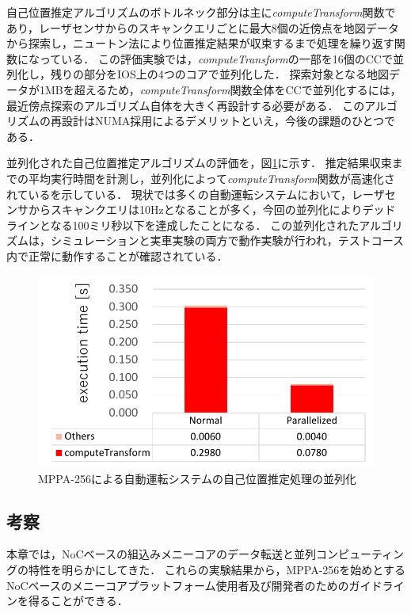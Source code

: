 \documentclass[submit,techrep]{ipsj_v2/UTF8/ipsj}
\begin{document}
自己位置推定アルゴリズムのボトルネック部分は主に\emph{computeTransform}関数であり，レーザセンサからのスキャンクエリごとに最大8個の近傍点を地図データから探索し，ニュートン法により位置推定結果が収束するまで処理を繰り返す関数になっている．
この評価実験では，\emph{computeTransform}の一部を16個のCCで並列化し，残りの部分をIOS上の4つのコアで並列化した．
探索対象となる地図データが1MBを超えるため，\emph{computeTransform}関数全体をCCで並列化するには，最近傍点探索のアルゴリズム自体を大きく再設計する必要がある．
このアルゴリズムの再設計はNUMA採用によるデメリットといえ，今後の課題のひとつである．

並列化された自己位置推定アルゴリズムの評価を，図\ref{fig:ndt_matching}に示す．
推定結果収束までの平均実行時間を計測し，並列化によって\emph{computeTransform}関数が高速化されているを示している．
現状では多くの自動運転システムにおいて，レーザセンサからスキャンクエリは10Hzとなることが多く，今回の並列化によりデッドラインとなる100ミリ秒以下を達成したことになる．
この並列化されたアルゴリズムは，シミュレーションと実車実験の両方で動作実験が行われ，テストコース内で正常に動作することが確認されている．

\begin{figure}[t]
  \centering
  \includegraphics[width=0.9\linewidth]{../figure/BarGraph_ndt_matching.pdf}
  \vspace{-2mm}
  \caption{\label{fig:ndt_matching}
  MPPA-256による自動運転システムの自己位置推定処理の並列化}
  \vspace{-2mm}
\end{figure}


\subsection{考察}
\label{sec:lessons}
本章では，NoCベースの組込みメニーコアのデータ転送と並列コンピューティングの特性を明らかにしてきた．
これらの実験結果から，MPPA-256を始めとするNoCベースのメニーコアプラットフォーム使用者及び開発者のためのガイドラインを得ることができる．
\end{document}
